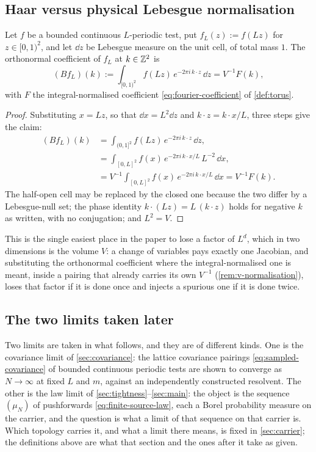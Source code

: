\subsection{Haar versus physical Lebesgue normalisation}

\begin{lemma}\label{lem:haar-lebesgue}
Let $f$ be a bounded continuous $L$-periodic test, put $f_L(z):=f(Lz)$ for $z\in[0,1)^2$, and let $\dd z$
be Lebesgue measure on the unit cell, of total mass $1$. The orthonormal coefficient of $f_L$ at
$k\in\mathbb{Z}^2$ is
\begin{equation}\label{eq:haar-coefficient}
  (Bf_L)(k):=\int_{[0,1)^2}f(Lz)\,e^{-2\pi i\,k\cdot z}\,\dd z=V^{-1}F(k),
\end{equation}
with $F$ the integral-normalised coefficient \eqref{eq:fourier-coefficient} of \cref{def:torus}.
\end{lemma}

\begin{proof}
Substituting $x=Lz$, so that $\dd x=L^2\dd z$ and $k\cdot z=k\cdot x/L$, three steps give the claim:
\begin{align*}
  (Bf_L)(k)
  &=\int_{(0,1]^2}f(Lz)\,e^{-2\pi i\,k\cdot z}\,\dd z ,\\
  &=\int_{[0,L]^2}f(x)\,e^{-2\pi i\,k\cdot x/L}\,L^{-2}\,\dd x ,\\
  &=V^{-1}\int_{[0,L]^2}f(x)\,e^{-2\pi i\,k\cdot x/L}\,\dd x=V^{-1}F(k) .
\end{align*}
The half-open cell may be replaced by the closed one because the two differ by a Lebesgue-null set; the
phase identity $k\cdot(Lz)=L\,(k\cdot z)$ holds for negative $k$ as written, with no conjugation; and
$L^2=V$.
\end{proof}

This is the single easiest place in the paper to lose a factor of $L^d$, which in two dimensions is the
volume $V$: a change of variables pays exactly one Jacobian, and substituting the orthonormal coefficient
where the integral-normalised one is meant, inside a pairing that already carries its own $V^{-1}$
(\cref{rem:v-normalisation}), loses that factor if it is done once and injects a spurious one if it is done
twice.

\subsection{The two limits taken later}

Two limits are taken in what follows, and they are of different kinds. One is the covariance limit of
\cref{sec:covariance}: the lattice covariance pairings \eqref{eq:sampled-covariance} of bounded continuous
periodic tests are shown to converge as $N\to\infty$ at fixed $L$ and $m$, against an independently
constructed resolvent. The other is the law limit of \cref{sec:tightness}--\cref{sec:main}: the object is
the sequence $(\mu_N)$ of pushforwards \eqref{eq:finite-source-law}, each a Borel probability measure on
the carrier, and the question is what a limit of that sequence on that carrier is. Which topology carries
it, and what a limit there means, is fixed in \cref{sec:carrier}; the definitions above are what that
section and the ones after it take as given.
